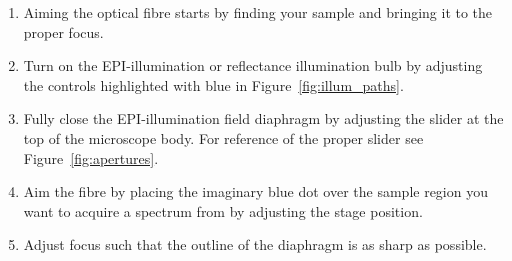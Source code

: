 \documentclass[a4paper]{scrartcl}
\begin{document}
\begin{enumerate}
	\item Aiming the optical fibre starts by finding your sample and bringing it to the proper focus.
	\item Turn on the EPI-illumination or reflectance illumination bulb by adjusting the controls highlighted with blue in Figure~\ref{fig:illum_paths}.
	\item Fully close the EPI-illumination field diaphragm by adjusting the slider at the top of the microscope body. For reference of the proper slider see Figure~\ref{fig:apertures}.
	\item Aim the fibre by placing the imaginary blue dot over the sample region you want to acquire a spectrum from by adjusting the stage position.
	\item Adjust focus such that the outline of the diaphragm is as sharp as possible.
\end{enumerate}
\end{document}
